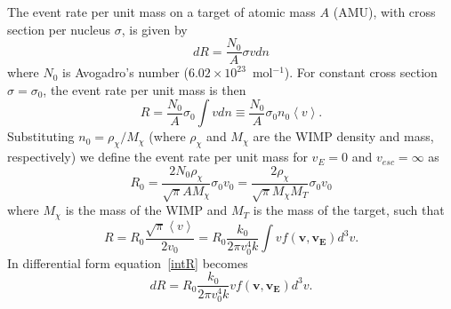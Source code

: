 The event rate per unit mass on a target of atomic mass $A$ (AMU), with cross section per nucleus $\sigma$, is given by
\begin{equation}
dR=\frac{N_0}{A} \sigma v dn
\end{equation}
where $N_0$ is Avogadro's number ($6.02\times10^{23} $~mol$^{-1}$).  For constant cross section $\sigma=\sigma_0$, the event rate per unit mass is then
\begin{equation}
R=\frac{N_0}{A}\sigma_0 \int v dn \equiv \frac{N_0}{A}\sigma_0n_0\left\langle v\right\rangle .
\end{equation}
Substituting $n_0=\rho_{\chi} / M_{\chi}$ (where $\rho_{\chi}$ and $M_{\chi}$ are the WIMP density and mass, respectively) we define the event rate per unit mass for $v_E=0$ and $v_{esc}=\infty$ as
\begin{equation} \label{R-not}
R_0=\frac{2 N_0 \rho_{\chi}}{\sqrt{\pi} A M_{\chi}} \sigma_0 v_0 = \frac{2 \rho_{\chi} }{\sqrt{\pi} M_{\chi} M_T} \sigma_0 v_0
\end{equation}
where $M_\chi$ is the mass of the WIMP and $M_T$ is the mass of the target, such that 
\begin{equation} \label{intR}
R=R_0 \frac{\sqrt{\pi} \left \langle v \right \rangle}{2 v_0} = R_0 \frac{k_0}{2 \pi v_0^4 k} \int v f(\mathbf{v},\mathbf{v_E}) d^3v.
\end{equation}
In differential form equation~\ref{intR} becomes
\begin{equation} \label{diffR}
dR = R_0 \frac{k_0}{2 \pi v_0^4 k} v f(\mathbf{v},\mathbf{v_E}) d^3v.
\end{equation}

